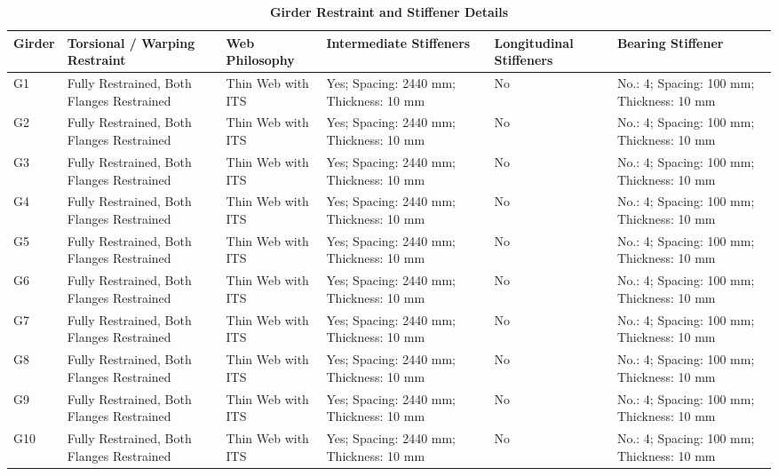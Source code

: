 \documentclass[12pt,a4paper]{report}
\numberwithin{table}{chapter}
\numberwithin{figure}{chapter}
\begin{document}
\vspace{4pt}
\begin{longtable}{|L{1.4cm}|p{2.2cm}|p{2.2cm}|p{3.0cm}|p{2.4cm}|p{2.2cm}|}
\caption{\textbf{Girder Restraint and Stiffener Details}}\\
\hline
\textbf{Girder} & \textbf{Torsional / Warping Restraint} & \textbf{Web Philosophy} & \textbf{Intermediate Stiffeners} & \textbf{Longitudinal Stiffeners} & \textbf{Bearing Stiffener} \\[6pt]
\hline
\endfirsthead
\endhead

G1 & Fully Restrained, Both Flanges Restrained & Thin Web with ITS & Yes; Spacing: 2440 mm; Thickness: 10 mm & No & No.: 4; Spacing: 100 mm; Thickness: 10 mm \\[8pt]
\hline
G2 & Fully Restrained, Both Flanges Restrained & Thin Web with ITS & Yes; Spacing: 2440 mm; Thickness: 10 mm & No & No.: 4; Spacing: 100 mm; Thickness: 10 mm \\[8pt]
\hline
G3 & Fully Restrained, Both Flanges Restrained & Thin Web with ITS & Yes; Spacing: 2440 mm; Thickness: 10 mm & No & No.: 4; Spacing: 100 mm; Thickness: 10 mm \\[8pt]
\hline
G4 & Fully Restrained, Both Flanges Restrained & Thin Web with ITS & Yes; Spacing: 2440 mm; Thickness: 10 mm & No & No.: 4; Spacing: 100 mm; Thickness: 10 mm \\[8pt]
\hline
G5 & Fully Restrained, Both Flanges Restrained & Thin Web with ITS & Yes; Spacing: 2440 mm; Thickness: 10 mm & No & No.: 4; Spacing: 100 mm; Thickness: 10 mm \\[8pt]
\hline
G6 & Fully Restrained, Both Flanges Restrained & Thin Web with ITS & Yes; Spacing: 2440 mm; Thickness: 10 mm & No & No.: 4; Spacing: 100 mm; Thickness: 10 mm \\[8pt]
\hline
G7 & Fully Restrained, Both Flanges Restrained & Thin Web with ITS & Yes; Spacing: 2440 mm; Thickness: 10 mm & No & No.: 4; Spacing: 100 mm; Thickness: 10 mm \\[8pt]
\hline
G8 & Fully Restrained, Both Flanges Restrained & Thin Web with ITS & Yes; Spacing: 2440 mm; Thickness: 10 mm & No & No.: 4; Spacing: 100 mm; Thickness: 10 mm \\[8pt]
\hline
G9 & Fully Restrained, Both Flanges Restrained & Thin Web with ITS & Yes; Spacing: 2440 mm; Thickness: 10 mm & No & No.: 4; Spacing: 100 mm; Thickness: 10 mm \\[8pt]
\hline
G10 & Fully Restrained, Both Flanges Restrained & Thin Web with ITS & Yes; Spacing: 2440 mm; Thickness: 10 mm & No & No.: 4; Spacing: 100 mm; Thickness: 10 mm \\[8pt]

\end{longtable}
\end{document}
